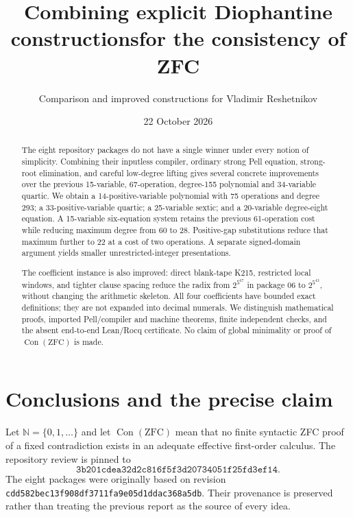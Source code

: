\documentclass[11pt]{article}
\title{Combining explicit Diophantine constructions\newline for the consistency of ZFC}
\author{Comparison and improved constructions for Vladimir Reshetnikov}
\date{22 October 2026}
\newcommand{\N}{\mathbb N}
\newcommand{\Con}{\operatorname{Con}}
\begin{document}
\maketitle
\begin{abstract}
The eight repository packages do not have a single winner under every notion of simplicity. Combining their inputless compiler, ordinary strong Pell equation, strong-root elimination, and careful low-degree lifting gives several concrete improvements over the previous 15-variable, 67-operation, degree-155 polynomial and 34-variable quartic. We obtain a 14-positive-variable polynomial with 75 operations and degree 293; a 33-positive-variable quartic; a 25-variable sextic; and a 20-variable degree-eight equation. A 15-variable six-equation system retains the previous 61-operation cost while reducing maximum degree from 60 to 28. Positive-gap substitutions reduce that maximum further to 22 at a cost of two operations. A separate signed-domain argument yields smaller unrestricted-integer presentations.

The coefficient instance is also improved: direct blank-tape K215, restricted local windows, and tighter clause spacing reduce the radix from $2^{5^{67}}$ in package 06 to $2^{5^{43}}$, without changing the arithmetic skeleton. All four coefficients have bounded exact definitions; they are not expanded into decimal numerals. We distinguish mathematical proofs, imported Pell/compiler and machine theorems, finite independent checks, and the absent end-to-end Lean/Rocq certificate. No claim of global minimality or proof of $\Con(\mathrm{ZFC})$ is made.
\end{abstract}

\section{Conclusions and the precise claim}

Let $\N=\{0,1,\ldots\}$ and let $\Con(\mathrm{ZFC})$ mean that no finite syntactic ZFC proof of a fixed contradiction exists in an adequate effective first-order calculus. The repository review is pinned to
\[
\texttt{3b201cdea32d2c816f5f3d20734051f25fd3ef14}.
\]
The eight packages were originally based on revision
\texttt{cdd582bec13f908df3711fa9e05d1ddac368a5db}. Their provenance is preserved rather than treating the previous report as the source of every idea.
\end{document}

